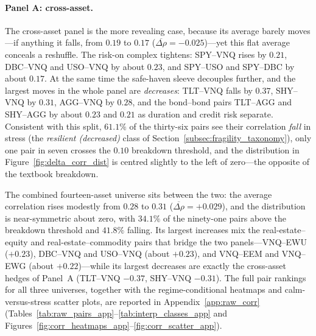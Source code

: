 \paragraph{Panel A: cross-asset.} The cross-asset panel is the more revealing case, because its average barely moves---if anything it falls, from $0.19$ to $0.17$ ($\overline{\Delta\rho} = -0.025$)---yet this flat average conceals a reshuffle. The risk-on complex tightens: SPY--VNQ rises by $0.21$, DBC--VNQ and USO--VNQ by about $0.23$, and SPY--USO and SPY--DBC by about $0.17$. At the same time the safe-haven sleeve decouples further, and the largest moves in the whole panel are \emph{decreases}: TLT--VNQ falls by $0.37$, SHY--VNQ by $0.31$, AGG--VNQ by $0.28$, and the bond--bond pairs TLT--AGG and SHY--AGG by about $0.23$ and $0.21$ as duration and credit risk separate. Consistent with this split, $61.1\%$ of the thirty-six pairs see their correlation \emph{fall} in stress (the \emph{resilient (decreased)} class of Section~\ref{subsec:fragility_taxonomy}), only one pair in seven crosses the $0.10$ breakdown threshold, and the distribution in Figure~\ref{fig:delta_corr_dist} is centred slightly to the left of zero---the opposite of the textbook breakdown.

The combined fourteen-asset universe sits between the two: the average correlation rises modestly from $0.28$ to $0.31$ ($\overline{\Delta\rho} = +0.029$), and the distribution is near-symmetric about zero, with $34.1\%$ of the ninety-one pairs above the breakdown threshold and $41.8\%$ falling. Its largest increases mix the real-estate--equity and real-estate--commodity pairs that bridge the two panels---VNQ--EWU ($+0.23$), DBC--VNQ and USO--VNQ (about $+0.23$), and VNQ--EEM and VNQ--EWG (about $+0.22$)---while its largest decreases are exactly the cross-asset hedges of Panel~A (TLT--VNQ $-0.37$, SHY--VNQ $-0.31$). The full pair rankings for all three universes, together with the regime-conditional heatmaps and calm-versus-stress scatter plots, are reported in Appendix~\ref{app:raw_corr} (Tables~\ref{tab:raw_pairs_app}--\ref{tab:interp_classes_app} and Figures~\ref{fig:corr_heatmaps_app}--\ref{fig:corr_scatter_app}).


